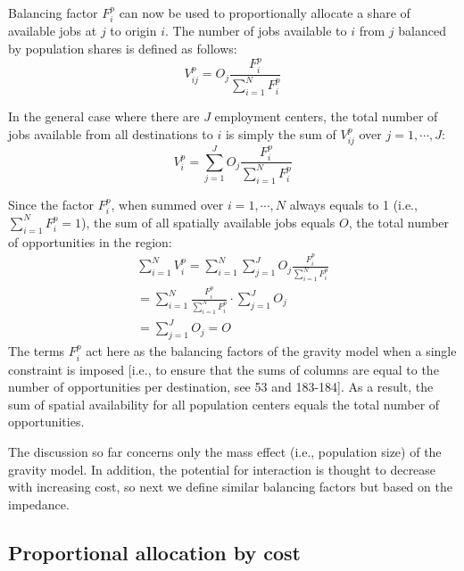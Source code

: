 \documentclass[10pt,letterpaper]{article}
\begin{document}
Balancing factor \(F^p_{i}\) can now be used to proportionally allocate
a share of available jobs at \(j\) to origin \(i\). The number of jobs
available to \(i\) from \(j\) balanced by population shares is defined
as follows: \[
V^p_{ij} = O_j\frac{F^p_{i}}{\sum_{i=1}^N F^p_{i}}
\]

In the general case where there are \(J\) employment centers, the total
number of jobs available from all destinations to \(i\) is simply the
sum of \(V^p_{ij}\) over \(j=1,\cdots, J\): \[
V^p_{i} = \sum_{j=1}^J O_j\frac{F^p_{i}}{\sum_{i=1}^N F^p_{i}}
\]

Since the factor \(F^p_{i}\), when summed over \(i=1,\cdots,N\) always
equals to 1 (i.e., \(\sum_{i=1}^{N} F^p_{i} = 1\)), the sum of all
spatially available jobs equals \(O\), the total number of opportunities
in the region: \[
\begin{array}{l}
\sum_{i=1}^N V^p_i =\sum_{i=1}^N\sum_{j=1}^JO_j\frac{F^p_{i}}{\sum_{i=1}^N F^p_{i}}\\
=\sum_{i=1}^N \frac{F^p_{i}}{\sum_{i=1}^N F^p_{i}}\cdot\sum_{j=1}^JO_j\\
=\sum_{j=1}^J O_j = O
\end{array}
\] The terms \(F^p_{i}\) act here as the balancing factors of the
gravity model when a single constraint is imposed {[}i.e., to ensure
that the sums of columns are equal to the number of opportunities per
destination, see 53 and 183-184{]}. As a result, the sum of spatial
availability for all population centers equals the total number of
opportunities.

The discussion so far concerns only the mass effect (i.e., population
size) of the gravity model. In addition, the potential for interaction
is thought to decrease with increasing cost, so next we define similar
balancing factors but based on the impedance.

\hypertarget{proportional-allocation-by-cost}{%
\subsection{Proportional allocation by
cost}\label{proportional-allocation-by-cost}}
\end{document}
